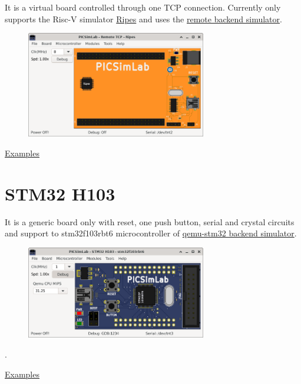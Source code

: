 It is a virtual board controlled through one TCP connection. 
Currently only supports the Risc-V simulator \href{https://github.com/mortbopet/Ripes}{Ripes} and 
uses the \hyperlink{def:remote}{remote backend simulator}.

\begin{figure}[H]
\center
\includegraphics[width=0.7\textwidth]{img/RemoteTCP.png} 
\end{figure} 

\href{https://lcgamboa.github.io/picsimlab_examples/board_Remote_TCP.html}{Examples}

\section{STM32 H103}

It is a generic board only with reset, one push button, serial and crystal circuits and support to stm32f103rbt6 microcontroller of 
\hyperlink{def:qemu-stm32}{qemu-stm32 backend simulator}.

\begin{figure}[H]
\center
\includegraphics[width=0.7\textwidth]{img/STM32_H103.png} 
\end{figure} 

.\vspace{0.5cm}

\href{https://lcgamboa.github.io/picsimlab_examples/board_STM32_H103.html}{Examples}


